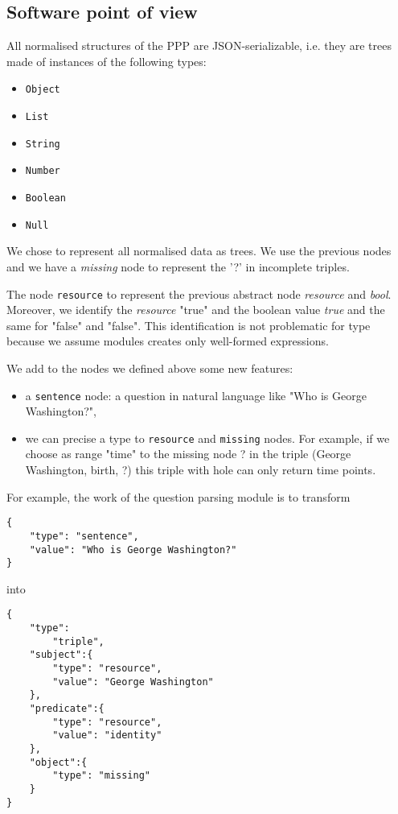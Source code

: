 \subsection{Software point of view}

All normalised structures of the PPP are JSON-serializable, i.e. they are trees made of instances of the following types:
\begin{itemize}
    \item \texttt{Object}
    \item \texttt{List}
    \item \texttt{String}
    \item \texttt{Number}
    \item \texttt{Boolean}
    \item \texttt{Null}
\end{itemize}

We chose to represent all normalised data as trees. We use the previous nodes and we have a \textsl{missing} node to represent the '?' in incomplete triples.

The node \texttt{resource} to represent the previous abstract node \textsl{resource} and \textsl{bool}. Moreover, we identify the \textsl{resource} "true" and the boolean value \textsl{true} and the same for "false" and "false". This identification is not problematic for type because we assume modules creates only well-formed expressions.

We add to the nodes we defined above some new features:
\begin{itemize}
    \item a \texttt{sentence} node: a question in natural language like "Who is George Washington?",
    \item we can precise a type to \texttt{resource} and \texttt{missing} nodes. For example, if we choose as range "time" to the missing node ? in the triple (George Washington, birth, ?) this triple with hole can only return time points.
\end{itemize}

For example, the work of the question parsing module is to transform 
\begin{verbatim}
{
    "type": "sentence", 
    "value": "Who is George Washington?"
}
\end{verbatim}
into 
\begin{verbatim}
{
    "type":
        "triple",
    "subject":{
        "type": "resource",
        "value": "George Washington"
    },
    "predicate":{
        "type": "resource",
        "value": "identity"
    },
    "object":{
        "type": "missing"
    }
}
\end{verbatim}

